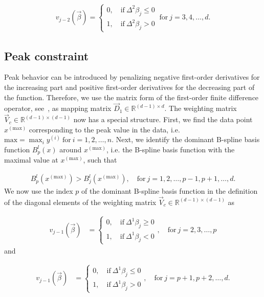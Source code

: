 \begin{align} \label{eq:weighting-matrix-conc-diagonal}
	v_{j-2}(\vec{\beta}) = \begin{cases}
		0, \quad \text{if} \ \Delta^2\beta_j \le 0 \\ 
		1, \quad \text{if} \ \Delta^2\beta_j > 0
	\end{cases}	\ \text{for} \ j=3,4, \dots, d.
\end{align}

\subsection{Peak constraint} \label{subsec:PeakC}

Peak behavior can be introduced by penalizing negative first-order derivatives for the increasing part and positive first-order derivatives for the decreasing part of the function. Therefore, we use the matrix form of the first-order finite difference operator, see~, as mapping matrix $\vec{D}_1 \in \mathbb{R}^{(d-1)\times d}$. The weighting matrix $\vec{V}_c \in \mathbb{R}^{(d-1) \times (d-1)}$ now has a special structure. First, we find the data point $x^{(\text{max})}$ corresponding to the peak value in the data, i.e. $\text{max} = \max_i y^{(i)} \ \text{for} \ i=1,2,\dots, n$. Next, we identify the dominant B-spline basis function $B_p^l(x)$ around $x^{(\text{max})}$, i.e. the B-spline basis function with the maximal value at $x^{(\text{max})}$, such that

\begin{align}
	B_p^l(x^{(\text{max})}) > B_j^l(x^{(\text{max})}), \quad \text{for} \ j=1,2,\dots,p-1,p+1,\dots,d.
\end{align} 
%
We now use the index $p$ of the dominant B-spline basis function in the definition of the diagonal elements of the weighting matrix $\vec{V}_c \in \mathbb{R}^{(d-1) \times (d-1)}$ as 

\begin{align}\label{eq:v_peak_1}
	v_{j-1}(\vec{\beta}) &= \begin{cases} 
		0, \quad \text{if} \ \Delta^1\beta_j \ge 0 \\ 
		1, \quad \text{if} \ \Delta^1\beta_j  < 0
	\end{cases}, \quad \text{for} \ j=2,3,\dots,p
\end{align}
%
and 

\begin{align}\label{eq:v_peak_2}
	v_{j-1}(\vec{\beta}) &= \begin{cases} 
		0, \quad \text{if} \ \Delta^1\beta_j \le 0 \\ 
		1, \quad \text{if} \ \Delta^1\beta_j > 0
	\end{cases}, \quad \text{for} \ j=p+1,p+2,\dots,d.
\end{align}
%
